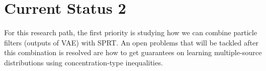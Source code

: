 \documentclass[english]{article}
\numberwithin{equation}{section}
\begin{document}
	\section*{Current Status 2}
	
	For this research path, the first priority is studying how we can combine particle filters (outputs of VAE) with SPRT. An open problems that will be tackled after this combination is resolved are how to get guarantees on learning multiple-source distributions using concentration-type inequalities.
\end{document}
